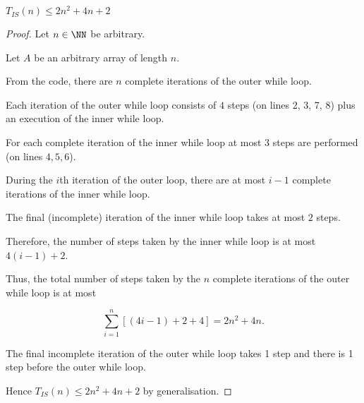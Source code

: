 \documentclass[11pt]{scrartcl}
\begin{document}
\begin{lemma}
$T_{IS}(n) \leq 2n^2+4n+2$
\end{lemma}
\begin{proof}
  \hfill

  Let $n\in\NN$ be arbitrary.

  Let $A$ be an arbitrary array of length $n$.

  From the code, there are $n$ complete iterations of the outer while loop.

  Each iteration of the outer while loop consists of $4$ steps (on
  lines 2, 3, 7, 8) plus an execution of the inner while loop.

  For each complete iteration of the inner while loop at most 3 steps
  are performed (on lines $4, 5, 6$).

  During the $i$th iteration of the outer loop, there are at most
  $i-1$ complete iterations of the inner while loop.

  The final (incomplete) iteration of the inner while loop takes at
  most $2$ steps.

  Therefore, the number of steps taken by the inner while loop is at
  most $4(i-1)+2$.

  Thus, the total number of steps taken by the $n$ complete iterations of the outer while loop is at most

  \begin{equation*}
\sum_{i=1}^n[(4i-1)+2 +4] = 2n^2+4n.
  \end{equation*}

  The final incomplete iteration of the outer while loop takes 1 step and there is 1 step before the outer while loop.

  Hence $T_{IS}(n) \leq 2n^2 + 4n + 2$ by generalisation.
\end{proof}

\end{document}
